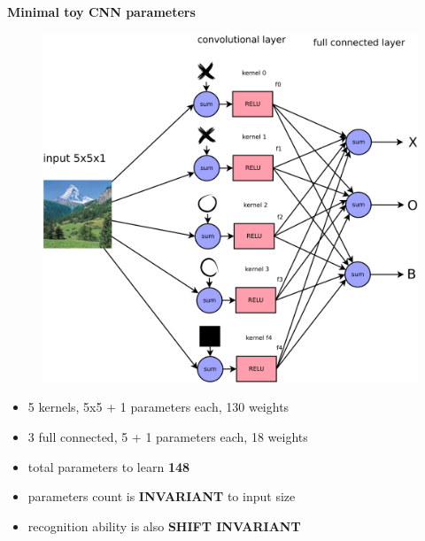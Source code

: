 \documentclass[xcolor=dvipsnames]{beamer}
\begin{document}
\begin{frame}{\bf Minimal toy CNN parameters}

\begin{figure}
  \includegraphics[scale=0.1]{../../diagrams/nn/toy_cnn.png}
\end{figure}

\begin{itemize}
    \item 5 kernels, 5x5 + 1 parameters each, 130 weights
    \item 3 full connected, 5 + 1 parameters each, 18 weights
    \item total parameters to learn {\bf \color{red} 148}
    \item parameters count is {\bf \color{red} INVARIANT} to input size
    \item recognition ability is also {\bf \color{red} SHIFT INVARIANT}
\end{itemize}

\end{frame}
\end{document}
